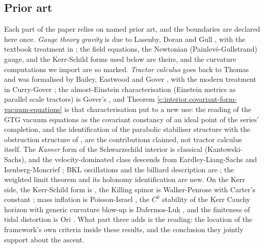 \documentclass[11pt]{article}
\theoremstyle{definition}
\theoremstyle{plain}
\begin{document}
\subsection*{Prior art}
\label{c:note.interior.setting-prior-art}
Each part of the paper relies on named prior art, and the boundaries are declared here once. \emph{Gauge theory gravity} is due to Lasenby, Doran and Gull \cite{LDG1998}, with the textbook treatment in \cite{DoranLasenby2003}; the field equations, the Newtonian (Painlev\'e-Gullstrand) gauge, and the Kerr-Schild forms used below are theirs, and the curvature computations we import are so marked. \emph{Tractor calculus} goes back to Thomas and was formalised by Bailey, Eastwood and Gover \cite{BEG1994}, with the modern treatment in Curry-Gover \cite{CurryGover2018}; the almost-Einstein characterisation (Einstein metrics as parallel scale tractors) is Gover's \cite{Gover2010}, and Theorem \ref{c:interior.covariant-form-vacuum-equations} is that characterisation put to a new use: the reading of the GTG vacuum equations as the covariant constancy of an ideal point of the series' completion, and the identification of the parabolic stabiliser structure with the obstruction structure of \cite{ButlerT1}, are the contributions claimed, not tractor calculus itself. The \emph{Kasner} form of the Schwarzschild interior is classical (Kantowski-Sachs), and the velocity-dominated class descends from Eardley-Liang-Sachs \cite{ELS1972} and Isenberg-Moncrief \cite{IsenbergMoncrief1990}; BKL oscillations and the billiard description are \cite{BKL1970, DHN2003}; the weighted limit theorem and its holonomy identification are new. On the Kerr side, the Kerr-Schild form is \cite{KerrSchild1965}, the Killing spinor is Walker-Penrose \cite{WalkerPenrose1970} with Carter's constant \cite{Carter1968}; mass inflation is Poisson-Israel \cite{PoissonIsrael1990}, the $C^0$ stability of the Kerr Cauchy horizon with generic curvature blow-up is Dafermos-Luk \cite{DafermosLuk2017}, and the finiteness of tidal distortion is Ori \cite{Ori1991}. What part three adds is the reading: the location of the framework's own criteria inside these results, and the conclusion they jointly support about the ascent.
\end{document}
